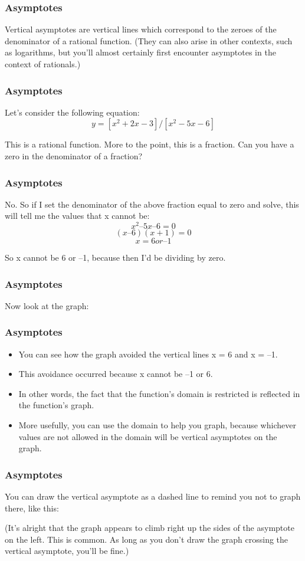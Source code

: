 \documentclass{beamer}
\begin{document}
\begin{frame}
\frametitle{Asymptotes}
\Large



Vertical asymptotes are vertical lines which correspond to the zeroes of the denominator of a rational function. (They can also arise in other contexts, such as logarithms, but you'll almost certainly first encounter asymptotes in the context of rationals.)
\end{frame}
\begin{frame}
	\frametitle{Asymptotes}
	\Large
Let's consider the following equation:
\[
y = [x^2 + 2x - 3] / [x^2 - 5x - 6]
\]

This is a rational function. More to the point, this is a fraction. Can you have a zero in the denominator of a fraction? 

\end{frame}
\begin{frame}
	\frametitle{Asymptotes}
	\Large
No. So if I set the denominator of the above fraction equal to zero and solve, this will tell me the values that x cannot be:
\[x^2 – 5x – 6 = 0 \]
\[(x – 6)(x + 1) = 0 \]
\[x = 6 or –1 \]

So x cannot be 6 or –1, because then I'd be dividing by zero.
\end{frame}
\begin{frame}
	\frametitle{Asymptotes}
	\Large


Now look at the graph:



\end{frame}
\begin{frame}
	\frametitle{Asymptotes}
	\Large
\begin{itemize}
\item You can see how the graph avoided the vertical lines x = 6 and x = –1. 
\item This avoidance occurred because x cannot be –1 or 6. 
\item In other words, the fact that the function's domain is restricted is reflected in the function's graph. 
\item More usefully, you can use the domain to help you graph, because whichever values are not allowed in the domain will be vertical asymptotes on the graph.
\end{itemize}

\end{frame}
\begin{frame}
	\frametitle{Asymptotes}
	\Large

You can draw the vertical asymptote as a dashed line to remind you not to graph there, like this:


(It's alright that the graph appears to climb right up the sides of the asymptote on the left. This is common. As long as you don't draw the graph crossing the vertical asymptote, you'll be fine.)
\end{frame}
\end{document}
